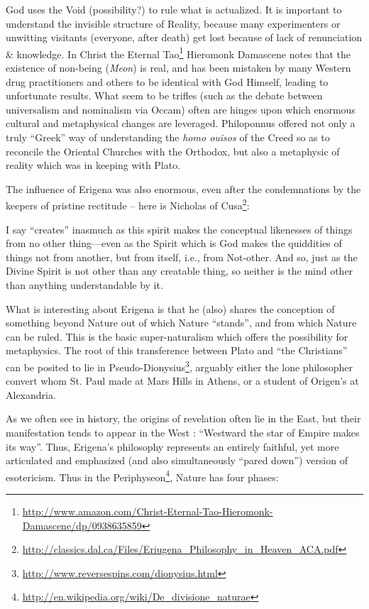God uses the Void (possibility?) to rule what is actualized. It is important to understand the invisible structure of Reality, because many experimenters or unwitting visitants (everyone, after death) get lost because of lack of renunciation \& knowledge. In Christ the Eternal Tao\footnote{\url{http://www.amazon.com/Christ-Eternal-Tao-Hieromonk-Damascene/dp/0938635859}} Hieromonk Damascene notes that the existence of non-being (\emph{Meon}) is real, and has been mistaken by many Western drug practitioners and others to be identical with God Himself, leading to unfortunate results. What seem to be trifles (such as the debate between universalism and nominalism via Occam) often are hinges upon which enormous cultural and metaphysical changes are leveraged. Philoponnus offered not only a truly ``Greek'' way of understanding the \emph{homo ouisos} of the Creed so as to reconcile the Oriental Churches with the Orthodox, but also a metaphysic of reality which was in keeping with Plato.

The influence of Erigena was also enormous, even after the condemnations by the keepers of pristine rectitude -- here is Nicholas of Cusa\footnote{\url{http://classics.dal.ca/Files/Eriugena\_Philosophy\_in\_Heaven\_ACA.pdf}}:

\begin{quotex}
I say ``creates'' inasmuch as this spirit makes the conceptual likenesses of things from no other thing---even as the Spirit which is God makes the quiddities of things not from another, but from itself, i.e., from Not-other. And so, just as the Divine Spirit is not other than any creatable thing, so neither is the mind other than anything understandable by it.
\end{quotex}


What is interesting about Erigena is that he (also) shares the conception of something beyond Nature out of which Nature ``stands'', and from which Nature can be ruled. This is the basic super-naturalism which offers the possibility for metaphysics. The root of this transference between Plato and ``the Christians'' can be posited to lie in Pseudo-Dionysius\footnote{\url{http://www.reversespins.com/dionysius.html}}, arguably either the lone philosopher convert whom St. Paul made at Mars Hills in Athens, or a student of Origen's at Alexandria.

As we often see in history, the origins of revelation often lie in the East, but their manifestation tends to appear in the West : ``Westward the star of Empire makes its way''. Thus, Erigena's philosophy represents an entirely faithful, yet more articulated and emphasized (and also simultaneously ``pared down'') version of esotericism. Thus in the Periphyseon\footnote{\url{http://en.wikipedia.org/wiki/De\_divisione\_naturae}}, Nature has four phases:

